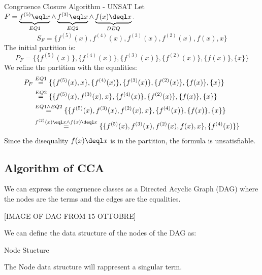\begin{example}{Congruence Closure Algorithm - UNSAT}
    Let $F = \underbrace{f^{(5)} \eql x}_{EQ1} \land \underbrace{f^{(3)} \eql x}_{EQ2} 
    \land \underbrace{f(x) \deql x}_{DEQ}$.
    \begin{equation*}
        S_F = \{ f^{(5)}(x), f^{(4)}(x), f^{(3)}(x), f^{(2)}(x), f(x), x \}
    \end{equation*}
    The initial partition is:
    \begin{equation*}
        P_F = 
        \{ \{ f^{(5)}(x)\}, \{ f^{(4)}(x)\}, \{ f^{(3)}(x)\}, \{ f^{(2)}(x)\}, \{ f(x)\},\{ x\}\}
    \end{equation*}
    We refine the partition with the equalities:
    \begin{align*}
        P_F &\stackrel{EQ1}{=} 
        \{ \{ f^{(5)}(x), x \},\{ f^{(4)}(x)\},\{ f^{(3)}(x)\},\{ f^{(2)}(x)\},\{ f(x)\},\{ x\}\} \\
        &\stackrel{EQ2}{=} 
        \{ \{ f^{(5)}(x), f^{(3)}(x), x \},\{ f^{(4)}(x)\},\{ f^{(2)}(x)\},\{ f(x)\},\{ x\}\} \\
        &\stackrel{EQ1 \land EQ2}{=}
        \{ \{ f^{(5)}(x), f^{(3)}(x), f^{(2)}(x), x \},\{ f^{(4)}(x)\},\{ f(x)\},\{ x\}\} \\ 
        &\stackrel{f^{(2)}(x) \eql x \land f(x) \deql x}{=}
        \{ \{ f^{(5)}(x), f^{(3)}(x), f^{(2)}(x), f(x), x \},\{ f^{(4)}(x)\}\}
    \end{align*}
    Since the disequality $f(x) \deql x$ is in the partition, the formula is unsatisfiable.
\end{example}

\subsection{Algorithm of CCA}
\label{subsec:Algorithm of CCA}

We can express the congruence classes as a Directed Acyclic Graph (DAG) 
where the nodes are the terms and the edges are the equalities.

[IMAGE OF DAG FROM 15 OTTOBRE]

We can define the data structure of the nodes of the DAG as:

\begin{codee}{Node Stucture}
\end{codee}

The Node data structure will rappresent a singular term.

